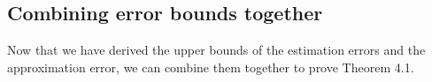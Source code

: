 \documentclass{article}
\begin{document}
 

\subsection{Combining error bounds together}\label{subsec:combine}
 Now that we have derived the upper bounds of the estimation errors and the approximation error, we can combine them together to prove Theorem 4.1. 
\end{document}
